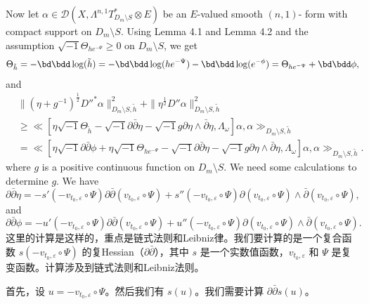 Now let $\alpha\in \mathcal{D}(X,\Lambda^{n,1}T_{D_{m}\setminus
S}^{*}\otimes E)$ be an $E$-valued smooth $(n,1)$- form with compact
support on $D_{m}\setminus S$. Using Lemma 4.1 and Lemma
4.2 and the assumption $\sqrt{-1}\Theta_{he^{-\Psi}}\geq
0$ on $D_{m}\setminus S$, we get
\begin{align*}
  \Theta_{\tilde{h}} =-\bd\bdd\log (\tilde{h})=-\bd\bdd\log(he^{-\Psi})-\bd\bdd\log(e^{-\phi}) 
  =\Theta_{he^{-\Psi}}+\bd\bdd\phi,
\end{align*}
and
\begin{equation}
\label{equ:smooth.3.31.1}
\begin{split}
&\|(\eta+g^{-1})^{\frac{1}{2}}D''^{*}\alpha\|^{2}_{D_m\setminus S,\tilde{h}}
+\|\eta^{\frac{1}{2}}D''\alpha\|^{2}_{D_m\setminus S,\tilde{h}}
\\&\geq\ll[\eta\sqrt{-1}\Theta_{\tilde{h}}-\sqrt{-1}\partial\bar\partial\eta-
\sqrt{-1}g\partial\eta\wedge\bar\partial\eta,\Lambda_{\omega}]\alpha,\alpha\gg_{D_m\setminus S,\tilde{h}}
\\&=\ll[\eta\sqrt{-1}\partial\bar\partial\phi+\eta\sqrt{-1}\Theta_{he^{-\Psi}}-\sqrt{-1}\partial\bar\partial\eta-
\sqrt{-1}g\partial\eta\wedge\bar\partial\eta,\Lambda_{\omega}]\alpha,\alpha\gg_{D_m\setminus S,\tilde{h}}.
\end{split}
\end{equation}
where $g$ is a positive continuous function on $D_{m}\setminus S$.
We need some calculations to determine $g$. We have
\begin{equation}
\partial\bar{\partial}\eta=-s'(-v_{t_0,\varepsilon}\circ \Psi)\partial\bar{\partial}(v_{t_0,\varepsilon}\circ \Psi)
+s''(-v_{t_0,\varepsilon}\circ \Psi)\partial(v_{t_0,\varepsilon}\circ \Psi)\wedge
\bar{\partial}(v_{t_0,\varepsilon}\circ \Psi),
\end{equation}
and
\begin{equation}
\partial\bar{\partial}\phi=-u'(-v_{t_0,\varepsilon}\circ \Psi)\partial\bar{\partial}(v_{t_0,\varepsilon}\circ \Psi)
+
u''(-v_{t_0,\varepsilon}\circ \Psi)\partial(v_{t_0,\varepsilon}\circ \Psi)
\wedge\bar{\partial}(v_{t_0,\varepsilon}\circ \Psi).
\end{equation}
这里的计算是这样的，重点是链式法则和Leibniz律。我们要计算的是一个复合函数 \(s(-v_{t_0,\varepsilon} \circ \Psi)\) 的复Hessian（\(\partial\bar{\partial}\)），其中 \(s\) 是一个实数值函数，\(v_{t_0,\varepsilon}\) 和 \(\Psi\) 是复变函数。计算涉及到链式法则和Leibniz法则。

首先，设 \(u = -v_{t_0,\varepsilon} \circ \Psi\)。然后我们有 \(s(u)\)。我们需要计算 \(\partial\bar{\partial}s(u)\)。

